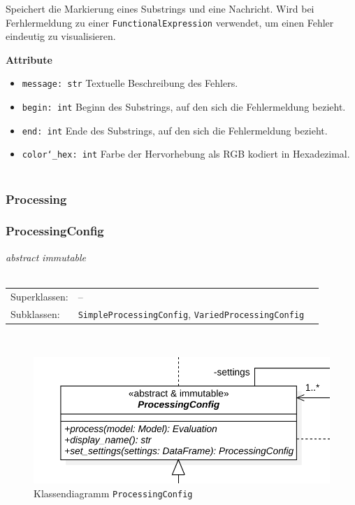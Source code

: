 \documentclass{article}
\begin{document}
Speichert die Markierung eines Substrings und eine Nachricht. Wird bei Ferhlermeldung zu einer \texttt{FunctionalExpression} verwendet, um einen Fehler eindeutig zu visualisieren.
\newline \newline

\textbf{Attribute}
\begin{itemize}
\item \texttt{message: str} \newline Textuelle Beschreibung des Fehlers.
\item \texttt{begin: int} \newline Beginn des Substrings, auf den sich die Fehlermeldung bezieht.
\item \texttt{end: int} \newline Ende des Substrings, auf den sich die Fehlermeldung bezieht.
\item \texttt{color\char`_hex: int} \newline Farbe der Hervorhebung als RGB kodiert in Hexadezimal.
\\\\
\end{itemize}


\newpage
\subsubsection{Processing}

\subsubsection*{\large{\textbf{ProcessingConfig}\label{cls:ProcessingConfig}}}
\textit{\flqq{}abstract\frqq} \textit{\flqq{}immutable\frqq}\normalsize\\\\
\begin{tabular}{lll}
 Superklassen: & --\\
 Subklassen: & \texttt{SimpleProcessingConfig}, \texttt{VariedProcessingConfig}
\end{tabular}\\
\begin{figure}[H]%
    \centering
    \includegraphics[width=13cm]{entwurf/Entwurf_dokument/img/cls/model/ProcessingConfig.png}
    \caption{Klassendiagramm \texttt{ProcessingConfig}}
\end{figure}
\end{document}
